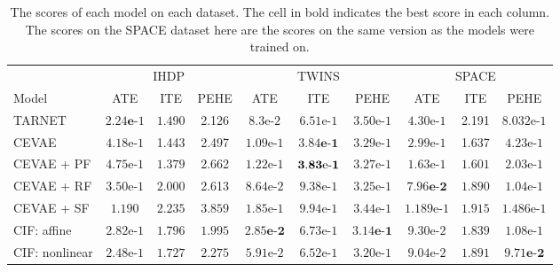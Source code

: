 \documentclass{report}
\begin{document}
\begin{appendices}
\begin{table}[h]
    \centering
    \begin{adjustbox}{center}
    \begin{tabular}{l||c|c|c||c|c|c||c|c|c|}
        & \multicolumn{3}{|c||}{IHDP} & \multicolumn{3}{|c||}{TWINS} & \multicolumn{3}{|c|}{SPACE} \\ 
         Model & ATE & ITE & PEHE & ATE & ITE & PEHE & ATE & ITE & PEHE \\
         \hline \hline
         TARNET & $\mathbf{2.24\text{e-}}1$ & $1.490$ & 2.126 &   $8.3\text{e-}2$ & $6.51\text{e-}1$ & $3.50\text{e-}1$ &     $4.30\text{e-}1$ & 2.191 & $8.032\text{e-}1$\\
         \hline
         CEVAE & $4.18\text{e-}1$ & 1.443 & 2.497 &    $1.09\text{e-}1$ & $\mathbf{3.84\textbf{e-}1}$ & $3.29\text{e-}1$ & $2.99\text{e-}1$ & 1.637 & $4.23\text{e-}1$\\
         \hline
         CEVAE + PF & $4.75\text{e-}1$ & $\mathbf{1.379}$ &  2.662 & $1.22\text{e-}1$ & $\mathbf{3.83\text{\text{e-}}1}$ & $3.27\text{e-}1$ & $1.63\text{e-}1$ & $\mathbf{1.601}$ & $2.03\text{e-}1$ \\
         \hline
         CEVAE + RF & $3.50\text{e-}1$ & $2.000$ & 2.613 &  $8.64\text{e-}2$ & $9.38\text{e-}1$ & $3.25\text{e-}1$ & \textbf{$\mathbf{7.96\text{e-}2}$} & $1.890$ & $1.04\text{e-}1$\\
         \hline 
         CEVAE + SF & $1.190$ & $2.235$ & $3.859$ &  $1.85\text{e-}1$ & $9.94\text{e-}1$ & $3.44\text{e-}1$ & $1.189\text{e-}1$ & $1.915$ & $1.486\text{e-}1$\\
         \hline
         CIF: affine & $2.82\text{e-}1$ & $1.796$ & $\mathbf{1.995}$ &    $\mathbf{2.85\text{e-}2}$ & $6.73\text{e-}1$ & $\mathbf{3.14\text{e-}1}$ & $9.30\text{e-}2$ & $1.839$ & $1.08\text{e-}1$ \\
         \hline
         CIF: nonlinear & $2.48\text{e-}1$ & $1.727$ & $2.275$ & $5.91\text{e-}2$ & $6.52\text{e-}1$ & $3.20\text{e-1}$ & $9.04\text{e-}2$ & $ 1.891$ & \textbf{$\mathbf{9.71\text{e-}2}$}\\
    \end{tabular}
    \end{adjustbox}
    \caption{The scores of each model on each dataset. The cell in bold indicates the best score in each column. The scores on the SPACE dataset here are the scores on the same version as the models were trained on.}
    \label{tab:results_experiments}
\end{table}


\end{appendices}
\end{document}
